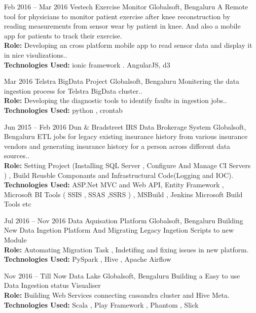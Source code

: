 \documentclass[]{friggeri-cv} %
\begin{document}
\begin{entrylist}
\entry
{Feb 2016 -- Mar 2016}
{Vestech Exercise Monitor}
{Globalsoft, Bengaluru}
{A Remote tool for physicians to monitor patient exercise after knee reconstruction by reading measurements from sensor wear by patient in knee. And also a mobile app for patients to track their exercise.\\
\textbf{Role:} Developing an cross platform mobile app to read sensor data and display it in nice visulizations..\\
\textbf{Technologies Used:} ionic framework . AngularJS, d3}
\end{entrylist}

\begin{entrylist}
\entry
{Mar 2016}
{Telstra BigData Project}
{Globalsoft, Bengaluru}
{Monitering the data ingestion process for Telstra BigData cluster..\\
\textbf{Role:} Developing the diagnostic tools to identify faults in ingestion jobs..\\
\textbf{Technologies Used:} python , crontab}
\end{entrylist}

\begin{entrylist}
\entry
{Jun 2015 -- Feb 2016}
{Dun \& Bradstreet IRS Data Brokerage System}
{Globalsoft, Bengaluru}
{ETL jobs for legacy existing insurance history from various insurance vendors and generating insurance history for a person across different data sources..\\
\textbf{Role:} Setting Project (Installing SQL Server , Configure And Manage CI Servers ) ,  
Build Reusble Componants and Infrastructural Code(Logging and IOC).\\
\textbf{Technologies Used:} ASP.Net MVC and Web API, Entity Framework , Microsoft BI Tools ( SSIS , SSAS ,SSRS ) , 
MSBuild , Jenkins Microsoft Build Tools etc}
\end{entrylist}


\begin{entrylist}
\entry
{Jul 2016 -- Nov 2016}
{Data Aquisation Platform}
{Globalsoft, Bengaluru}
{Building New Data Ingetion Platform And Migrating Legacy Ingetion Scripts to new Module\\
\textbf{Role:} Automating Migration Task , Indetifing and fixing issues in new platform.\\
\textbf{Technologies Used:} PySpark , Hive , Apache Airflow}
\end{entrylist}

\begin{entrylist}
\entry
{Nov 2016 -- Till Now}
{Data Lake}
{Globalsoft, Bengaluru}
{Building a Easy to use Data Ingestion status Visualiser \\
\textbf{Role:} Building Web Services connecting cassandra cluster and Hive Meta.\\
\textbf{Technologies Used:} Scala , Play Framework , Phantom , Slick }
\end{entrylist}
\end{document}
